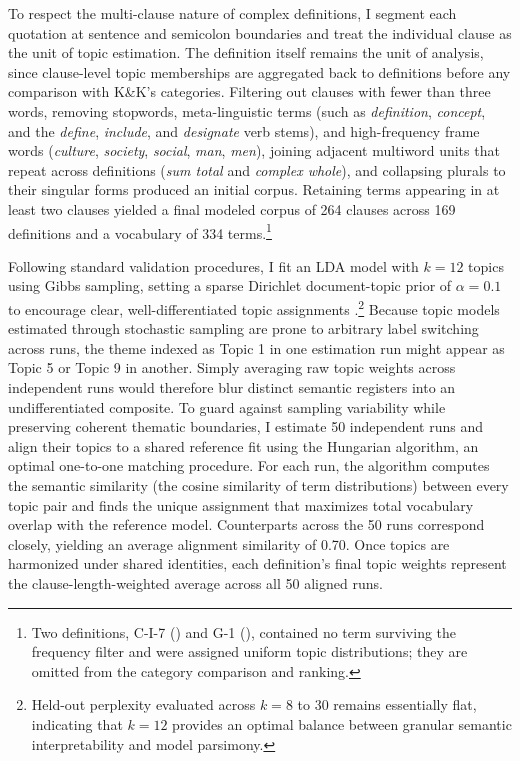 \documentclass[11pt]{article}
\begin{document}
To respect the multi-clause nature of complex definitions, I segment each quotation at sentence and semicolon boundaries and treat the individual clause as the unit of topic estimation. The definition itself remains the unit of analysis, since clause-level topic memberships are aggregated back to definitions before any comparison with K\&K's categories. Filtering out clauses with fewer than three words, removing stopwords, meta-linguistic terms (such as \emph{definition}, \emph{concept}, and the \emph{define}, \emph{include}, and \emph{designate} verb stems), and high-frequency frame words (\emph{culture}, \emph{society}, \emph{social}, \emph{man}, \emph{men}), joining adjacent multiword units that repeat across definitions (\emph{sum total} and \emph{complex whole}), and collapsing plurals to their singular forms produced an initial corpus. Retaining terms appearing in at least two clauses yielded a final modeled corpus of 264 clauses across 169 definitions and a vocabulary of 334 terms.\footnote{Two definitions, C-I-7 (\citealt{simmons1942}) and G-1 (\citealt{sapir1921}), contained no term surviving the frequency filter and were assigned uniform topic distributions; they are omitted from the category comparison and ranking.}

Following standard validation procedures, I fit an LDA model with $k = 12$ topics using Gibbs sampling, setting a sparse Dirichlet document-topic prior of $\alpha = 0.1$ to encourage clear, well-differentiated topic assignments \citep{griffiths2004finding}.\footnote{Held-out perplexity evaluated across $k = 8$ to $30$ remains essentially flat, indicating that $k = 12$ provides an optimal balance between granular semantic interpretability and model parsimony.} Because topic models estimated through stochastic sampling are prone to arbitrary label switching across runs, the theme indexed as Topic 1 in one estimation run might appear as Topic 5 or Topic 9 in another. Simply averaging raw topic weights across independent runs would therefore blur distinct semantic registers into an undifferentiated composite. To guard against sampling variability while preserving coherent thematic boundaries, I estimate 50 independent runs and align their topics to a shared reference fit using the Hungarian algorithm, an optimal one-to-one matching procedure. For each run, the algorithm computes the semantic similarity (the cosine similarity of term distributions) between every topic pair and finds the unique assignment that maximizes total vocabulary overlap with the reference model. Counterparts across the 50 runs correspond closely, yielding an average alignment similarity of 0.70. Once topics are harmonized under shared identities, each definition's final topic weights represent the clause-length-weighted average across all 50 aligned runs.
\end{document}
